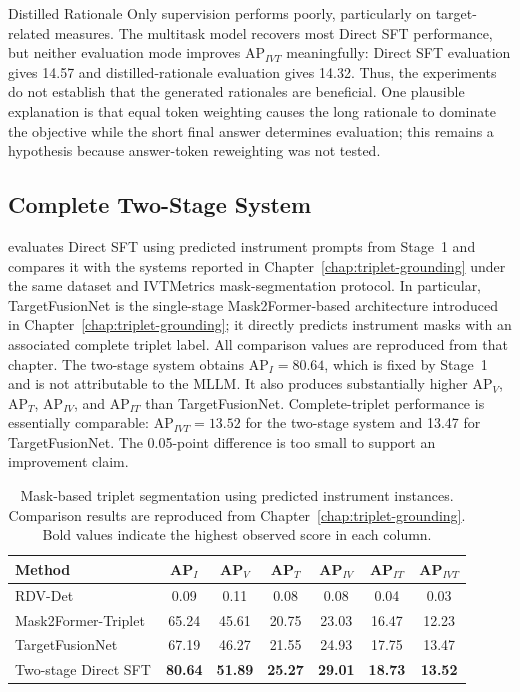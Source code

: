 Distilled Rationale Only supervision performs poorly, particularly on target-related measures. The multitask model recovers most Direct SFT performance, but neither evaluation mode improves AP$_{IVT}$ meaningfully: Direct SFT evaluation gives 14.57 and distilled-rationale evaluation gives 14.32. Thus, the experiments do not establish that the generated rationales are beneficial. One plausible explanation is that equal token weighting causes the long rationale to dominate the objective while the short final answer determines evaluation; this remains a hypothesis because answer-token reweighting was not tested.

\subsection{Complete Two-Stage System}

 evaluates Direct SFT using predicted instrument prompts from Stage~1 and compares it with the systems reported in Chapter~\ref{chap:triplet-grounding} under the same dataset and IVTMetrics mask-segmentation protocol. In particular, TargetFusionNet is the single-stage Mask2Former-based architecture introduced in Chapter~\ref{chap:triplet-grounding}; it directly predicts instrument masks with an associated complete triplet label. All comparison values are reproduced from that chapter. The two-stage system obtains AP$_I=80.64$, which is fixed by Stage~1 and is not attributable to the MLLM. It also produces substantially higher AP$_V$, AP$_T$, AP$_{IV}$, and AP$_{IT}$ than TargetFusionNet. Complete-triplet performance is essentially comparable: AP$_{IVT}=13.52$ for the two-stage system and 13.47 for TargetFusionNet. The 0.05-point difference is too small to support an improvement claim.

\begin{table}[htb!]
\centering
\caption{Mask-based triplet segmentation using predicted instrument instances. Comparison results are reproduced from Chapter~\ref{chap:triplet-grounding}. Bold values indicate the highest observed score in each column.}
\label{tab:c5:predicted-grounding}
\begin{tabular}{lcccccc}
\toprule
Method & AP$_I$ & AP$_V$ & AP$_T$ & AP$_{IV}$ & AP$_{IT}$ & AP$_{IVT}$ \\
\midrule
RDV-Det~\cite{nwoye2023cholectriplet2022} & 0.09 & 0.11 & 0.08 & 0.08 & 0.04 & 0.03 \\
Mask2Former-Triplet~\cite{alabi2026grounding} & 65.24 & 45.61 & 20.75 & 23.03 & 16.47 & 12.23 \\
TargetFusionNet~\cite{alabi2026grounding} & 67.19 & 46.27 & 21.55 & 24.93 & 17.75 & 13.47 \\
Two-stage Direct SFT & \textbf{80.64} & \textbf{51.89} & \textbf{25.27} & \textbf{29.01} & \textbf{18.73} & \textbf{13.52} \\
\bottomrule
\end{tabular}
\end{table}

